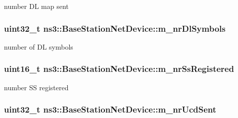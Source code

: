 number DL map sent 

\subsubsection[{\texorpdfstring{m\+\_\+nr\+Dl\+Symbols}{m_nrDlSymbols}}]{\setlength{\rightskip}{0pt plus 5cm}uint32\+\_\+t ns3\+::\+Base\+Station\+Net\+Device\+::m\+\_\+nr\+Dl\+Symbols\hspace{0.3cm}{\ttfamily [private]}}\hypertarget{classns3_1_1BaseStationNetDevice_a52d28f1ed36c36d5597ec69118fb0e72}{}\label{classns3_1_1BaseStationNetDevice_a52d28f1ed36c36d5597ec69118fb0e72}


number of DL symbols 

\subsubsection[{\texorpdfstring{m\+\_\+nr\+Ss\+Registered}{m_nrSsRegistered}}]{\setlength{\rightskip}{0pt plus 5cm}uint16\+\_\+t ns3\+::\+Base\+Station\+Net\+Device\+::m\+\_\+nr\+Ss\+Registered\hspace{0.3cm}{\ttfamily [private]}}\hypertarget{classns3_1_1BaseStationNetDevice_a831c0ed3e7c7c68d8c4021e73ebb4324}{}\label{classns3_1_1BaseStationNetDevice_a831c0ed3e7c7c68d8c4021e73ebb4324}


number SS registered 

\subsubsection[{\texorpdfstring{m\+\_\+nr\+Ucd\+Sent}{m_nrUcdSent}}]{\setlength{\rightskip}{0pt plus 5cm}uint32\+\_\+t ns3\+::\+Base\+Station\+Net\+Device\+::m\+\_\+nr\+Ucd\+Sent\hspace{0.3cm}{\ttfamily [private]}}\hypertarget{classns3_1_1BaseStationNetDevice_aad51b6d3d70d291803d8912d2072d36b}{}\label{classns3_1_1BaseStationNetDevice_aad51b6d3d70d291803d8912d2072d36b}


